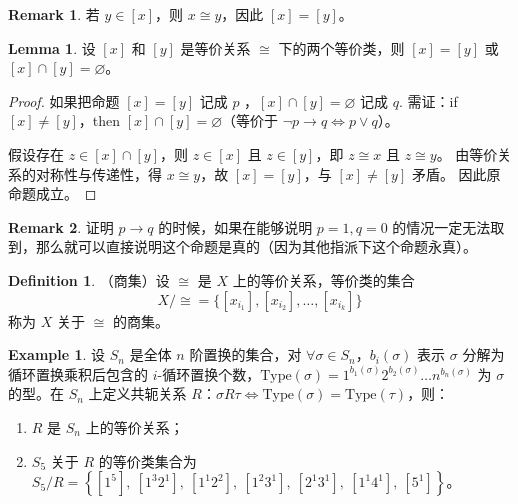 \documentclass[oneside]{book}
\theoremstyle{definition}
\newtheorem{example}{Example}[section]
\newtheorem{definition}{Definition}[section]
\newtheorem{remark}{Remark}[section]
\newtheorem{lemma}{Lemma}[section]
\begin{document}
\begin{remark}
	若 \( y \in [x] \)，则 \( x \cong y \)，因此 \( [x] = [y] \)。
\end{remark}

\begin{lemma}
	设 \( [x] \) 和 \( [y] \) 是等价关系 \( \cong \) 下的两个等价类，则 \( [x] = [y] \) 或 \( [x] \cap [y] = \varnothing \)。
\end{lemma}

\begin{proof}
	如果把命题 \( [x] = [y] \) 记成 \(p\) ，\( [x] \cap [y] = \varnothing \) 记成 \(q\).
	需证：if \( [x] \neq [y] \)，then \( [x] \cap [y] = \varnothing \)（等价于 \( \neg p \to q \iff p \lor q \)）。
	
	假设存在 \( z \in [x] \cap [y] \)，则 \( z \in [x] \) 且 \( z \in [y] \)，即 \( z \cong x \) 且 \( z \cong y \)。
	由等价关系的对称性与传递性，得 \( x \cong y \)，故 \( [x] = [y] \)，与 \( [x] \neq [y] \) 矛盾。
	因此原命题成立。
\end{proof}

\begin{remark}
	证明 \(p \to q \) 的时候，如果在能够说明 \( p=1 , q=0 \) 的情况一定无法取到，那么就可以直接说明这个命题是真的（因为其他指派下这个命题永真）。
\end{remark}
\begin{definition}
	（商集）设 \( \cong \) 是 \( X \) 上的等价关系，等价类的集合
	\[
	X/\cong = \{ [x_{i_1}], [x_{i_2}], \dots, [x_{i_k}] \}
	\]
	称为 \( X \) 关于 \( \cong \) 的商集。
\end{definition}



\begin{example}
	设 \( S_n \) 是全体 \( n \) 阶置换的集合，对 \( \forall \sigma \in S_n \)，\( b_i(\sigma) \) 表示 \( \sigma \) 分解为循环置换乘积后包含的 \( i \)-循环置换个数，\( \text{Type}(\sigma) = 1^{b_1(\sigma)} 2^{b_2(\sigma)} \dots n^{b_n(\sigma)} \) 为 \( \sigma \) 的型。在 \( S_n \) 上定义共轭关系 \( R \)：\( \sigma R \tau \iff \text{Type}(\sigma) = \text{Type}(\tau) \)，则：
	\begin{enumerate}
		\item \( R \) 是 \( S_n \) 上的等价关系；
		\item \( S_5 \) 关于 \( R \) 的等价类集合为 \( S_5/R = \left\{ [1^5],\ [1^3 2^1],\ [1^1 2^2],\ [1^2 3^1],\ [2^1 3^1],\ [1^1 4^1],\ [5^1] \right\} \)。
	\end{enumerate}
\end{example}
\end{document}
